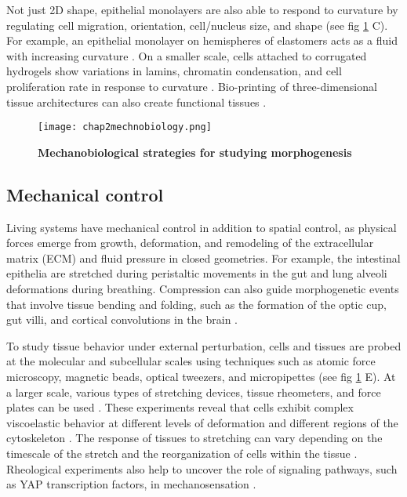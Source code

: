 Not just 2D shape, epithelial monolayers are also able to respond to curvature by regulating cell migration, orientation, cell/nucleus size, and shape \cite{marin-llaurado2022, schamberger2022} (see fig \ref{fig_2_2} C). For example, an epithelial monolayer on hemispheres of elastomers acts as a fluid with increasing curvature \cite{tang2022}. On a smaller scale, cells attached to corrugated hydrogels show variations in lamins, chromatin condensation, and cell proliferation rate in response to curvature \cite{luciano2021}. Bio-printing of three-dimensional tissue architectures can also create functional tissues \cite{brassard2021,  breau2022}.

\begin{figure}[h!]
	\centering
	\texttt{[image: chap2mechnobiology.png]}
	\caption{\label{fig_2_2} \textbf{Mechanobiological strategies for studying morphogenesis} \cite{vianello2019}}
\end{figure}

\hypertarget{mechanical-control}{%
\subsection{Mechanical control}\label{mechanical-control}}

Living systems have mechanical control in addition to spatial control, as physical forces emerge from growth, deformation, and remodeling of the extracellular matrix (ECM) and fluid pressure in closed geometries. For example, the intestinal epithelia are stretched during peristaltic movements in the gut and lung alveoli deformations during breathing. Compression can also guide morphogenetic events that involve tissue bending and folding, such as the formation of the optic cup, gut villi, and cortical convolutions in the brain \cite{okuda2018, shyer2013, tallinen2016}.

To study tissue behavior under external perturbation, cells and tissues are probed at the molecular and subcellular scales using techniques such as atomic force microscopy, magnetic beads, optical tweezers, and micropipettes \cite{bao2003} (see fig \ref{fig_2_2} E). At a larger scale, various types of stretching devices, tissue rheometers, and force plates can be used \cite{xi2018}. These experiments reveal that cells exhibit complex viscoelastic behavior at different levels of deformation and different regions of the cytoskeleton \cite{mofrad2009}. The response of tissues to stretching can vary depending on the timescale of the stretch and the reorganization of
cells within the tissue \cite{guillot2013}. Rheological experiments also help to uncover the role of signaling pathways, such as YAP transcription factors, in mechanosensation \cite{wagh2021}.

